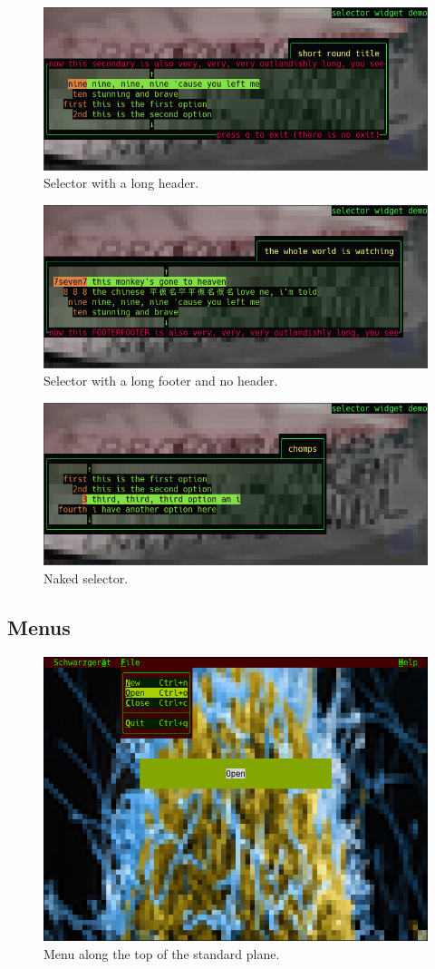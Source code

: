 \documentclass[letterpaper,10pt]{article}
\begin{document}
\begin{figure}
  \centering \includegraphics[width=.75\linewidth]{media/selector3.png}
    \caption{Selector with a long header.}
\end{figure}

\begin{figure}
\centering \includegraphics[width=.75\linewidth]{media/selector4.png}
\caption{Selector with a long footer and no header.}
\end{figure}

\begin{figure}
  \centering \includegraphics[width=.75\linewidth]{media/selector5.png}
  \caption{Naked selector.}
\end{figure}

\subsection{Menus}
\begin{figure}
    \centering
    \includegraphics[width=.75\linewidth]{media/menutop.png}
    \caption{Menu along the top of the standard plane.}
\end{figure}
\end{document}
